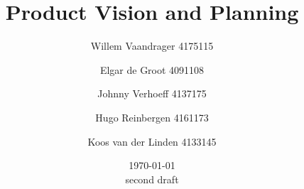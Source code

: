 \begin{titlepage}
\title{{\Huge Product Vision and Planning}}
\author{Willem Vaandrager 4175115 \\
\and Elgar de Groot 4091108 \\
\and Johnny Verhoeff 4137175 \\
\and Hugo Reinbergen 4161173 \\
\and Koos van der Linden 4133145}
\date{\today \\ second draft}
\maketitle
\end{titlepage}